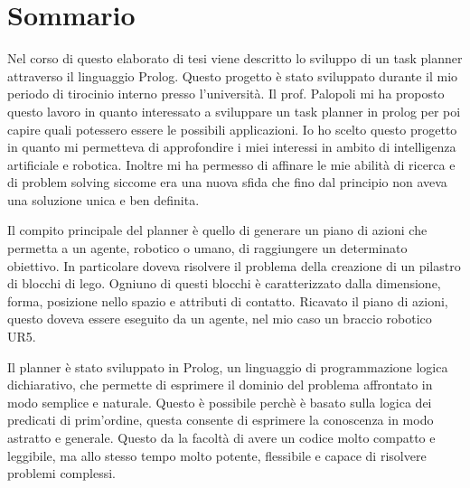 \chapter*{Sommario} %
\label{sommario}


Nel corso di questo elaborato di tesi viene descritto lo sviluppo di un task planner attraverso il linguaggio Prolog.
Questo progetto è stato sviluppato durante il mio periodo di tirocinio interno presso l'università.
Il prof. Palopoli mi ha proposto questo lavoro in quanto interessato a sviluppare un task planner in prolog per poi capire quali potessero essere le possibili applicazioni.
Io ho scelto questo progetto in quanto mi permetteva di approfondire i miei interessi in ambito di intelligenza artificiale e robotica.
Inoltre mi ha permesso di affinare le mie abilità di ricerca e di problem solving siccome era una nuova sfida che fino dal principio non aveva una soluzione unica e ben definita.  

Il compito principale del planner è quello di generare un piano di azioni che permetta a un agente, robotico o umano, di raggiungere un determinato obiettivo.
In particolare doveva risolvere il problema della creazione di un pilastro di blocchi di lego. Ogniuno di questi blocchi è caratterizzato dalla dimensione, forma, posizione nello spazio e attributi di contatto.
Ricavato il piano di azioni, questo doveva essere eseguito da un agente, nel mio caso un braccio robotico UR5. 

Il planner è stato sviluppato in Prolog, un linguaggio di programmazione logica dichiarativo, che permette di esprimere il dominio del problema affrontato in modo semplice e naturale.
Questo è possibile perchè è basato sulla logica dei predicati di prim'ordine, questa consente di esprimere la conoscenza in modo astratto e generale.
Questo da la facoltà di avere un codice molto compatto e leggibile, ma allo stesso tempo molto potente, flessibile e capace di risolvere problemi complessi.


